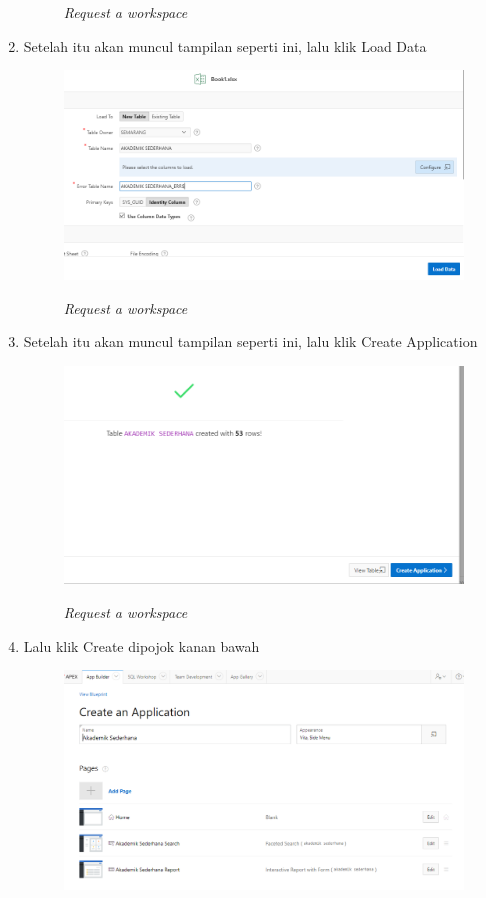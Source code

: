 \begin{enumerate}
\begin{figure}[!htbp]
    \label{gambar 7}
     \caption{\textit{Request a workspace}}
\end{figure}
\item Setelah itu akan muncul tampilan seperti ini, lalu klik Load Data
\begin{figure}[!htbp]
    \centering
    \includegraphics[scale=0.5]{figure/24.PNG}
    \label{gambar 7}
     \caption{\textit{Request a workspace}}
\end{figure} \vspace{6cm}
\item Setelah itu akan muncul tampilan seperti ini, lalu klik Create Application
\begin{figure}[!htbp]
    \centering
    \includegraphics[scale=0.5]{figure/25.PNG}
    \label{gambar 7}
     \caption{\textit{Request a workspace}}
\end{figure} \vspace{6cm}
\item Lalu klik Create dipojok kanan bawah
\begin{figure}[!htbp]
    \centering
    \includegraphics[scale=0.5]{figure/26.PNG}

\end{figure}
\end{enumerate}
